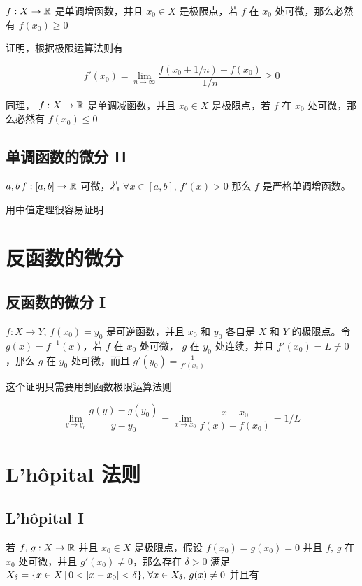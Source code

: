 $f: X \to \mathbb{R}$ 是单调增函数，并且 $x_0 \in X$ 是极限点，若 $f$ 在 $x_0$ 处可微，那么必然有 $f(x_0) \ge 0$

证明，根据极限运算法则有

\[
f'(x_0) = \lim_{n \to \infty}\frac{f(x_0 + 1/n) - f(x_0)}{1/n} \ge 0
\]

同理，
$f: X \to \mathbb{R}$ 是单调减函数，并且 $x_0 \in X$ 是极限点，若 $f$ 在 $x_0$ 处可微，那么必然有 $f(x_0) \le 0$

\subsection{单调函数的微分 II}

$a,b \, f: [a,b] \to \mathbb{R}$ 可微，若 $\forall x \in [a,b],\, f'(x) > 0$ 那么 $f$ 是严格单调增函数。

用中值定理很容易证明

\section{反函数的微分}

\subsection{反函数的微分 I}

$f: X \to Y,\, f(x_0) = y_0$ 是可逆函数，并且 $x_0$ 和 $y_0$ 各自是 $X$ 和 $Y$ 的极限点。令 $g(x) = f^{-1}(x)$，若
$f$ 在 $x_0$ 处可微， $g$ 在 $y_0$ 处连续，并且 $f'(x_0) = L \ne 0$，那么 $g$ 在 $y_0$ 处可微，而且 $g'(y_0) = \frac{1}{f'(x_0)}$

这个证明只需要用到函数极限运算法则

\[
\lim_{y \to y_0}\frac{g(y) - g(y_0)}{y -y_0} = \lim_{x \to x_0}\frac{x-x_0}{f(x) - f(x_0)} = 1/L
\]

\section{L'h\^{o}pital 法则}

\subsection{L'h\^{o}pital I}

若 $f,\,g : X \to \mathbb{R}$ 并且 $x_0 \in X$ 是极限点，假设 $f(x_0) = g(x_0) = 0$ 并且 $f,\,g$ 在 $x_0$ 处可微，并且 $g'(x_0) \ne 0 $，那么存在 $\delta > 0$ 满足
$X_{\delta} = \{ x \in X \,\vert\, 0 < \lvert  x - x_0\rvert <\delta \},\, \forall x  \in X_{\delta},\, g(x) \ne 0$ 并且有

